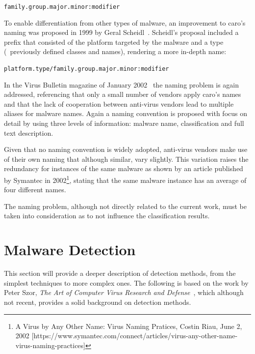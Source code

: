 \begin{center}\texttt{family.group.major.minor:modifier}\end{center}

To enable differentiation from other types of malware, an improvement to \gls{caro}'s naming was proposed in 1999 by Geral Scheidl~\cite{scheidl:naming}.
Scheidl's proposal included a prefix that consisted of the platform targeted by the malware and a type (\ie\ previously defined classes and names), rendering a more in-depth name:

\begin{center}\texttt{platform.type/family.group.major.minor:modifier}\end{center}

In the Virus Bulletin magazine of January 2002~\cite{virus_bulletin} the naming problem is again addressed, referencing that only a small number of vendors apply \gls{caro}'s names and that the lack of cooperation between anti-virus vendors lead to multiple aliases for malware names.
Again a naming convention is proposed with focus on detail by using three levels of information: malware name, classification and full text description.

Given that no naming convention is widely adopted, anti-virus vendors make use of their own naming that although similar, vary slightly.
This variation raises the redundancy for instances of the same malware as shown by an article published by Symantec in 2002\footnote{A Virus by Any Other Name: Virus Naming Pratices, Costin Riau, June 2, 2002 [https://www.symantec.com/connect/articles/virus-any-other-name-virus-naming-practices]}, stating that the same malware instance has an average of four different names.

The naming problem, although not directly related to the current work, must be taken into consideration as to not influence the classification results.

\section{Malware Detection}
\label{section:mal_detec}

This section will provide a deeper description of detection methods, from the simplest techniques to more complex ones. The following is based on the work by Peter Szor, \textit{The Art of Computer Virus Research and Defense}~\cite{szor:art}, which although not recent, provides a solid background on detection methods.

